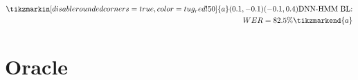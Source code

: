 \documentclass{beamer}
\begin{document}
\begin{frame}
\begin{minipage}[bt]{.7\textwidth}
  \end{minipage}%
  \begin{minipage}[tb]{.25\textwidth}
    \begin{equation*}
    \begin{split}
      \tikzmarkin[disable rounded corners=true, color=tug_red!50]{a}(0.1,-0.1)(-0.1  ,0.4)
      \text{DNN-HMM BL:} \\ WER = 82.5 \%
      \tikzmarkend{a}
    \end{split}
    \end{equation*}  
  \end{minipage}
\end{frame}



\section{Oracle}
\end{document}
